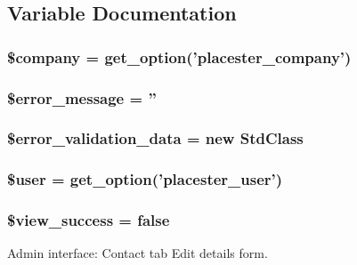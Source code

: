 \subsection{Variable Documentation}
\hypertarget{contact__edit_8php_a3306bb3d7f99fc57bee9e96f928769d4}{
\subsubsection[{\$company}]{\setlength{\rightskip}{0pt plus 5cm}\$company = get\_\-option('placester\_\-company')}}
\label{de/d4d/contact__edit_8php_a3306bb3d7f99fc57bee9e96f928769d4}
\hypertarget{contact__edit_8php_ae838cbd355959defbd4d49d0fbe7b273}{
\subsubsection[{\$error\_\-message}]{\setlength{\rightskip}{0pt plus 5cm}\$error\_\-message = ''}}
\label{de/d4d/contact__edit_8php_ae838cbd355959defbd4d49d0fbe7b273}
\hypertarget{contact__edit_8php_ae9bd679c49b80e9f12a3c0c90ff0e5c3}{
\subsubsection[{\$error\_\-validation\_\-data}]{\setlength{\rightskip}{0pt plus 5cm}\$error\_\-validation\_\-data = new StdClass}}
\label{de/d4d/contact__edit_8php_ae9bd679c49b80e9f12a3c0c90ff0e5c3}
\hypertarget{contact__edit_8php_a598ca4e71b15a1313ec95f0df1027ca5}{
\subsubsection[{\$user}]{\setlength{\rightskip}{0pt plus 5cm}\$user = get\_\-option('placester\_\-user')}}
\label{de/d4d/contact__edit_8php_a598ca4e71b15a1313ec95f0df1027ca5}
\hypertarget{contact__edit_8php_abb388ebff52ac480d577be234950bbf6}{
\subsubsection[{\$view\_\-success}]{\setlength{\rightskip}{0pt plus 5cm}\$view\_\-success = false}}
\label{de/d4d/contact__edit_8php_abb388ebff52ac480d577be234950bbf6}


Admin interface: Contact tab Edit details form. 

